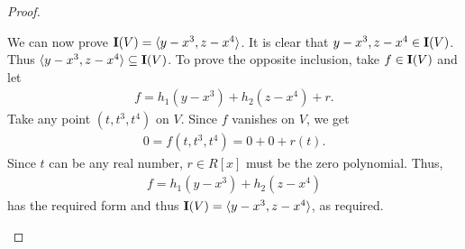 \begin{proof}
\begin{enumerate}
        We can now prove $\mathbf{I}(V) = \langle y-x^3, z-x^4\rangle$. It is clear that $y-x^3, z-x^4\in \mathbf{I}(V)$. 
        Thus $\langle y-x^3, z-x^4\rangle\subseteq \mathbf{I}(V)$. 
        To prove the opposite inclusion, take $f\in \mathbf{I}(V)$ and let
        \begin{align*}
            f = h_1(y-x^3) + h_2(z-x^4) + r.
        \end{align*}
        Take any point $(t,t^3,t^4)$ on $V$. Since $f$ vanishes on $V$, we get
        \begin{align*}
            0 = f(t,t^3,t^4) = 0+0+r(t).
        \end{align*}
        Since $t$ can be any real number, $r\in R[x]$ must be the zero polynomial. Thus,
        \begin{align*}
            f = h_1(y-x^3) + h_2(z-x^4)
        \end{align*}
        has the required form and thus $\mathbf{I}(V) = \langle y-x^3, z-x^4\rangle$, as required.
    \end{enumerate}
\end{proof}

